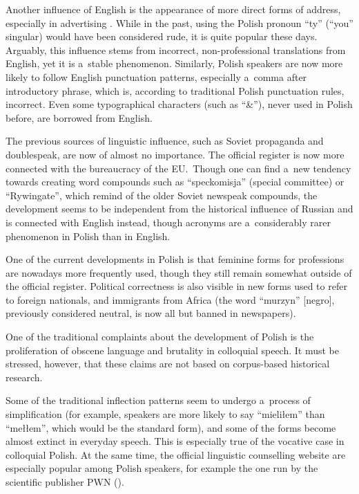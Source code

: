 \begin{multicols}{2}

Another influence of English is the appearance of more direct forms of
address, especially in advertising \cite{Chlopicki2000}. While in the
past, using the Polish pronoun “ty” (“you” singular) would
have been considered rude, it is quite popular these days. Arguably,
this influence stems from incorrect, non-professional translations
from English, yet it is a~stable phenomenon. Similarly, Polish
speakers are now more likely to follow English punctuation patterns,
especially a~comma after introductory phrase, which is, according to
traditional Polish punctuation rules, incorrect. Even some
typographical characters (such as “\&”), never used in Polish
before, are borrowed from English. 

The previous sources of linguistic influence, such as Soviet
propaganda and doublespeak, are now of almost no importance. The
official register is now more connected with the bureaucracy of the
EU.~Though one can find a~new tendency towards creating word compounds
such as “speckomisja” (special committee) or “Rywingate”,
which remind of the older Soviet newspeak compounds, the development
seems to be independent from the historical influence of Russian and
is connected with English instead, though acronyms are a~considerably
rarer phenomenon in Polish than in English. 


One of the current developments in Polish is that feminine forms for
professions are nowadays more frequently used, though they still
remain somewhat outside of the official register. Political
correctness is also visible in new forms used to refer to foreign
nationals, and immigrants from Africa (the word “murzyn” [negro],
previously considered neutral, is now all but banned in newspapers). 

One of the traditional complaints about the development of Polish is
the proliferation of obscene language and brutality in colloquial
speech. It must be stressed, however, that these claims are not based
on corpus-based historical research. 

Some of the traditional inflection patterns seem to undergo a~process
of simplification (for example, speakers are more likely to say
“mieliłem” than “mełłem”, which would be the standard
form), and some of the forms become almost extinct in everyday speech.
This is especially true of the vocative case in colloquial Polish. At
the same time, the official linguistic counselling website are
especially popular among Polish speakers, for example the one run by
the scientific publisher PWN (\cite{poradniapwn}). 


\end{multicols}
